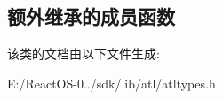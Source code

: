 \subsection*{额外继承的成员函数}


该类的文档由以下文件生成\+:\begin{DoxyCompactItemize}
\item 
E\+:/\+React\+O\+S-\/0../sdk/lib/atl/atltypes.\+h\end{DoxyCompactItemize}
